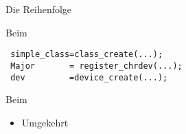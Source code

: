 \begin{frame}[fragile]{Die Reihenfolge}
\begin{block}{Beim }
\begin{lstlisting}
 simple_class=class_create(...);
 Major       = register_chrdev(...);
 dev         =device_create(...);
\end{lstlisting}
\end{block}
\begin{block}{Beim }
 \begin{itemize}
  \item Umgekehrt
 \end{itemize}
\end{block}
\end{frame} 
